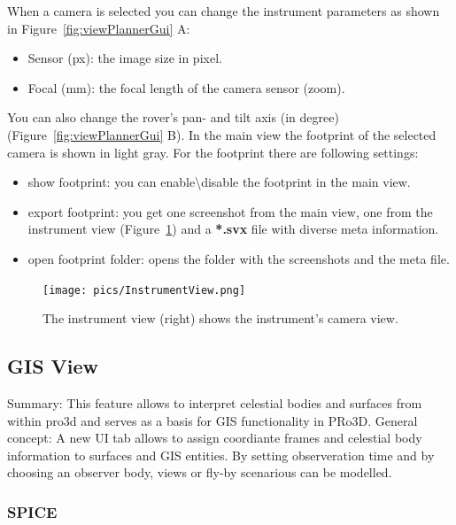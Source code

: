 When a camera is selected you can change the instrument parameters as shown in Figure~\ref{fig:viewPlannerGui} A:
\begin{itemize}
	\item Sensor (px): the image size in pixel.
	\item Focal (mm): the focal length of the camera sensor (zoom).
\end{itemize}
You can also change the rover's pan- and tilt axis (in degree) (Figure~\ref{fig:viewPlannerGui} B).
In the main view the footprint of the selected camera is shown in light gray. For the footprint there are following settings:
\begin{itemize}
	\item show footprint: you can enable\textbackslash disable the footprint in the main view.
	\item export footprint: you get one screenshot from the main view, one from the instrument view (Figure~\ref{fig:instView}) and a \textbf{*.svx} file with diverse meta information.
	\item open footprint folder: opens the folder with the screenshots and the meta file.
\end{itemize}
\begin{figure}[h]
    	\centering
    		\texttt{[image: pics/InstrumentView.png]}
    	\caption[Instrument View]{The instrument view (right) shows the instrument's camera view.}
    	\label{fig:instView}
   \end{figure}

\newpage
\subsection{GIS View}
\label{sec:gisview}


Summary: This feature allows to interpret celestial bodies and surfaces
from within pro3d and serves as a basis for GIS functionality in PRo3D.
General concept: A new UI tab allows to assign coordiante frames and
celestial body information to surfaces and GIS entities. By setting
observeration time and by choosing an observer body, views or fly-by
scenarious can be modelled.

\hypertarget{spice}{%
	\subsubsection{SPICE}\label{spice}}

